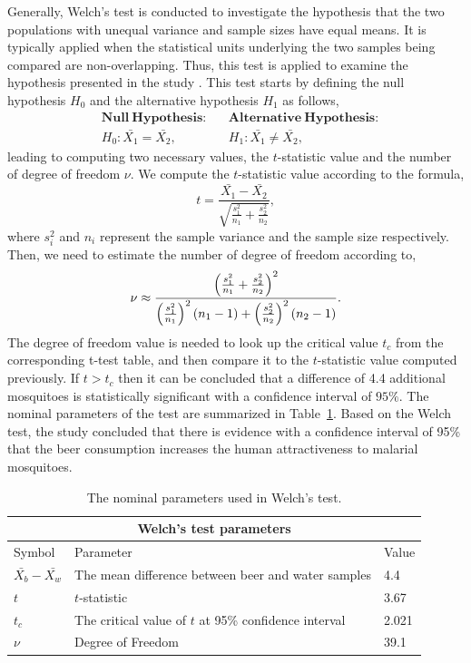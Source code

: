 Generally, Welch's test is conducted to investigate the hypothesis that the two populations with unequal variance and sample sizes have equal means. It is typically applied when the statistical units underlying the two samples being compared are non-overlapping. Thus, this test is applied to examine the hypothesis presented in the study \cite{lefevre2010beer}. This test starts by defining the null hypothesis $\mathit{{H_{0}}}$ and the alternative hypothesis $\mathit{{H_{1}}}$ as follows,
\begin{align*}
 &\mathbf{Null~Hypothesis:}  &  &\mathbf{Alternative~Hypothesis:}  \\
 &H_0: \bar{X_1} = \bar{X_2}, &  &H_1: \bar{X_1} \neq \bar{X_2},
\end{align*}
leading to computing two necessary values, the $t$-statistic value and the number of degree of freedom $\nu$. We compute the $t$-statistic value according to the formula,
\begin{equation*}
t = \frac{\bar{X_1}-\bar{X_2}}{\sqrt{\frac{{s^2_1}}{n_1} +\frac{{s^2_2}}{n_2}}},
\end{equation*}
where $s{_i^2}$ and $ n_{i}$ represent the sample variance and the sample size respectively. Then, we need to estimate the number of degree of freedom according to,
\begin{equation*}
\nu \approx \large \frac{\left(\frac{{s^2_1}}{n_1} +\frac{{s^2_2}}{n_2}\right)^2}{\left(\frac{s^2_1}{n_1}\right)^2\left(n_1 -1\right) + \left(\frac{{s^2_2}}{n_2}\right)^2\left(n_2 -1\right)}.
\end{equation*}
The degree of freedom value is needed to look up the critical value $t_c$ from the corresponding t-test table, and then compare it to the $t$-statistic value computed previously. If $t > t_{c}$ then it can be concluded that a difference of 4.4 additional mosquitoes is statistically significant with a confidence interval of $95\%$. The nominal parameters of the test are summarized in Table~\ref{Wttest}. Based on the Welch test, the study concluded that there is evidence with a confidence interval of 95\% that the beer consumption increases the human attractiveness to malarial mosquitoes.
\begin{table}[b]
\begin{center}
\caption{The nominal parameters used in Welch's test.\label{Wttest}}
\begin{tabular}{l|p{9.5cm}|l} \hline\hline\multicolumn{3}{c}{Welch's test parameters}\\
\hline Symbol & Parameter & Value \\ \hline
$\bar{X_b} - \bar{X_w}$ & The mean difference between beer and water samples & 4.4 \\
$t$ & $t$-statistic & 3.67\\
$t_c$ & The critical value of $t$ at 95\% confidence interval &  2.021\\
$\nu$ & Degree of Freedom &  39.1 \\ \hline
 \end{tabular} \end{center} \end{table}

